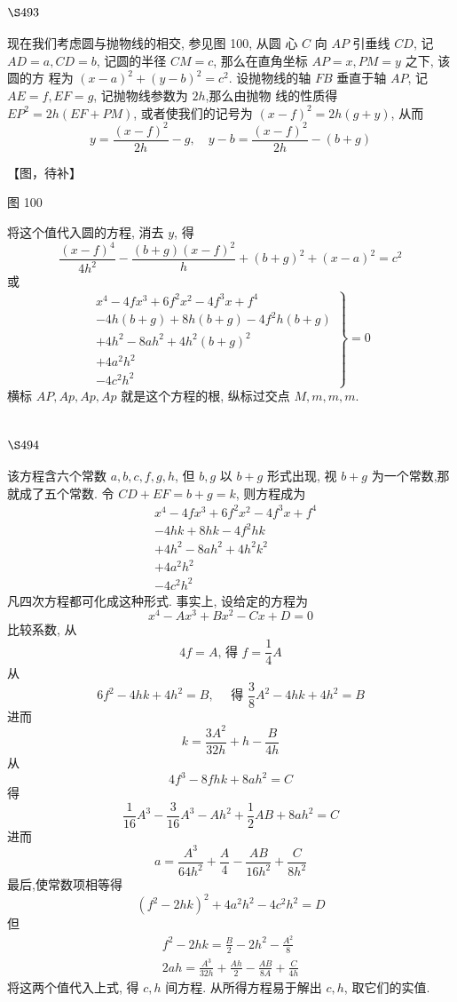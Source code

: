 \section{$\S 493$}

现在我们考虑圆与抛物线的相交, 参见图 100, 从圆 心 $C$ 向 $A P$ 引垂线 $C D$, 记 $A D=a, C D=b$, 记圆的半径 $C M=c$, 那么在直角坐标 $A P=x, P M=y$ 之下, 该圆的方 程为 $(x-a)^{2}+(y-b)^{2}=c^{2}$. 设抛物线的轴 $F B$ 垂直于轴 $A P$, 记 $A E=f, E F=g$, 记抛物线参数为 $2 h$,那么由抛物 线的性质得 $E P^{2}=2 h(E F+P M)$, 或者使我们的记号为 $(x-f)^{2}=2 h(g+y)$, 从而
\[
y=\frac{(x-f)^{2}}{2 h}-g, \quad y-b=\frac{(x-f)^{2}}{2 h}-(b+g)
\]

【图，待补】

图 100

将这个值代入圆的方程, 消去 $y$, 得
\[
\frac{(x-f)^{4}}{4 h^{2}}-\frac{(b+g)(x-f)^{2}}{h}+(b+g)^{2}+(x-a)^{2}=c^{2}
\]
或
\[
\left.\begin{array}{l}
x^{4}-4 f x^{3}+6 f^{2} x^{2}-4 f^{3} x+f^{4} \\
-4 h(b+g)+8 h(b+g)-4 f^{2} h(b+g) \\
+4 h^{2}-8 a h^{2}+4 h^{2}(b+g)^{2} \\
+4 a^{2} h^{2} \\
-4 c^{2} h^{2}
\end{array}\right\}=0
\]
横标 $A P, A p, A p, A p$ 就是这个方程的根, 纵标过交点 $M, m, m, m$.

\section{$\S 494$}

该方程含六个常数 $a, b, c, f, g, h$, 但 $b, g$ 以 $b+g$ 形式出现, 视 $b+g$ 为一个常数,那 就成了五个常数. 令 $C D+E F=b+g=k$, 则方程成为
\[
\begin{aligned}
& x^{4}-4 f x^{3}+6 f^{2} x^{2}-4 f^{3} x+f^{4} \\
& -4 h k+8 h k-4 f^{2} h k \\
& +4 h^{2}-8 a h^{2}+4 h^{2} k^{2} \\
& +4 a^{2} h^{2} \\
& -4 c^{2} h^{2}
\end{aligned}
\]
凡四次方程都可化成这种形式. 事实上, 设给定的方程为
\[
x^{4}-A x^{3}+B x^{2}-C x+D=0
\]
比较系数, 从
\[
4 f=A \text {, 得 } f=\frac{1}{4} A
\]
从
\[
6 f^{2}-4 h k+4 h^{2}=B, \quad \text { 得 } \frac{3}{8} A^{2}-4 h k+4 h^{2}=B
\]
进而
\[
k=\frac{3 A^{2}}{32 h}+h-\frac{B}{4 h}
\]
从
\[
4 f^{3}-8 f h k+8 a h^{2}=C
\]
得
\[
\frac{1}{16} A^{3}-\frac{3}{16} A^{3}-A h^{2}+\frac{1}{2} A B+8 a h^{2}=C
\]
进而
\[
a=\frac{A^{3}}{64 h^{2}}+\frac{A}{4}-\frac{A B}{16 h^{2}}+\frac{C}{8 h^{2}}
\]
最后,使常数项相等得
\[
\left(f^{2}-2 h k\right)^{2}+4 a^{2} h^{2}-4 c^{2} h^{2}=D
\]
但
\[
\begin{gathered}
f^{2}-2 h k=\frac{B}{2}-2 h^{2}-\frac{A^{2}}{8} \\
2 a h=\frac{A^{3}}{32 h}+\frac{A h}{2}-\frac{A B}{8 A}+\frac{C}{4 h}
\end{gathered}
\]
将这两个值代入上式, 得 $c, h$ 间方程. 从所得方程易于解出 $c, h$, 取它们的实值.

